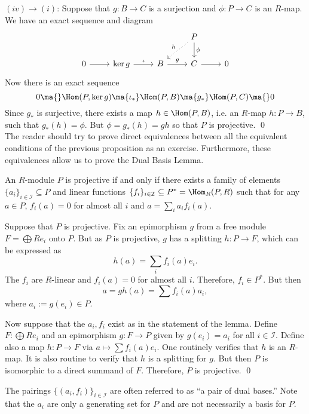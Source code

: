 $(iv)\to(i)$: Suppose that $g: B \to C$ is a surjection and $\phi: P \to C$ is an $R$-map. We have an exact sequence and diagram
	\[
	\begin{tikzcd}
	& & & P \arrow{d}{\phi} \arrow[swap,dotted]{dl}{h} & \\
	0 \arrow{r} & \ker g \arrow{r}{\iota} & B \arrow{r}{g} & C \arrow{r} & 0 
	\end{tikzcd}
	\]
Now there is an exact sequence
	\[
	0 \ma{} \Hom(P,\ker g) \ma{\iota_*} \Hom(P,B) \ma{g_*} \Hom(P,C) \ma{} 0
	\]
Since $g_*$ is surjective, there exists a map $h \in \Hom(P,B)$, i.e. an $R$-map $h: P \to B$, such that $g_*(h)=\phi$. But $\phi=g_*(h)=gh$ so that $P$ is projective. \qed \\


 The reader should try to prove direct equivalences between all the equivalent conditions of the previous proposition as an exercise. Furthermore, these equivalences allow us to prove the Dual Basis Lemma.
 

\begin{lem} \label{lem:dualbasis}
An $R$-module $P$ is projective if and only if there exists a family of elements $\{a_i\}_{i \in \mathcal{I}} \subseteq P$ and linear functions $\{f_i\}_{i \in \mathcal{I}} \subseteq P^*=\Hom_R(P,R)$ such that for any $a \in P$, $f_i(a)=0$ for almost all $i$ and $a= \sum_i a_if_i(a)$. 
\end{lem}

\pf Suppose that $P$ is projective. Fix an epimorphism $g$ from a free module $F= \bigoplus Re_i$ onto $P$. But as $P$ is projective, $g$ has a splitting $h: P \to F$, which can be expressed as
	\[
	h(a)= \sum_i f_i(a)e_i.
	\]
The $f_i$ are $R$-linear and $f_i(a)=0$ for almost all $i$. Therefore, $f_i \in P^*$. But then
	\[
	a= gh(a) = \sum f_i(a)a_i,
	\]
where $a_i:= g(e_i) \in P$. 

Now suppose that the $a_i,f_i$ exist as in the statement of the lemma. Define $F: \bigoplus Re_i$ and an epimorphism $g: F \to P$ given by $g(e_i)=a_i$ for all $i \in \mathcal{I}$. Define also a map $h: P \to F$ via $a \mapsto \sum f_i(a)e_i$. One routinely verifies that $h$ is an $R$-map. It is also routine to verify that $h$ is a splitting for $g$. But then $P$ is isomorphic to a direct summand of $F$. Therefore, $P$ is projective. \qed \\


\begin{rem}
The pairings $\{(a_i,f_i)\}_{i \in \mathcal{I}}$ are often referred to as ``a pair of dual bases.'' Note that the $a_i$ are only a generating set for $P$ and are not necessarily a basis for $P$.
\end{rem}


